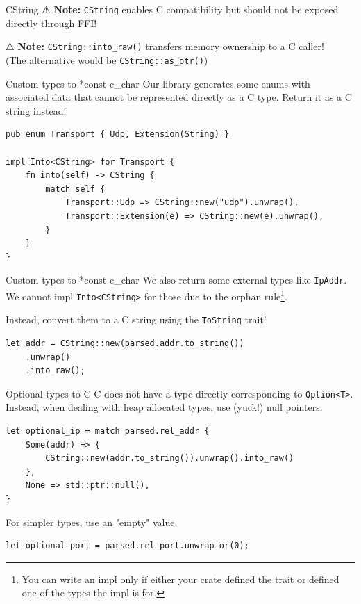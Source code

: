 \documentclass[aspectratio=1610,14pt,t]{beamer}
\begin{document}
\begin{frame}[c]{CString}
  ⚠ \textbf{Note:} \texttt{CString} enables C compatibility but should not be
  exposed directly through FFI!

  ⚠ \textbf{Note:} \texttt{CString::into\_raw()} transfers memory ownership to a
  C caller!\\(The alternative would be \texttt{CString::as\_ptr()})
\end{frame}

\begin{frame}[c,fragile]{Custom types to *const c\_char}
  Our library generates some enums with associated data that cannot be
  represented directly as a C type. Return it as a C string instead!

  \begin{verbatim}
pub enum Transport { Udp, Extension(String) }

impl Into<CString> for Transport {
    fn into(self) -> CString {
        match self {
            Transport::Udp => CString::new("udp").unwrap(),
            Transport::Extension(e) => CString::new(e).unwrap(),
        }
    }
}
  \end{verbatim}
\end{frame}

\begin{frame}[c,fragile]{Custom types to *const c\_char}
  We also return some external types like \texttt{IpAddr}. We cannot impl
  \texttt{Into<CString>} for those due to the orphan rule\footnote{You can write
  an impl only if either your crate defined the trait or defined one of the
  types the impl is for.}.

  Instead, convert them to a C string using the \texttt{ToString} trait!

  \begin{verbatim}
let addr = CString::new(parsed.addr.to_string())
    .unwrap()
    .into_raw();
  \end{verbatim}
\end{frame}

\begin{frame}[c,fragile]{Optional types to C}
  C does not have a type directly corresponding to \texttt{Option<T>}. Instead,
  when dealing with heap allocated types, use (yuck!) null pointers.

  \begin{verbatim}
let optional_ip = match parsed.rel_addr {
    Some(addr) => {
        CString::new(addr.to_string()).unwrap().into_raw()
    },
    None => std::ptr::null(),
}
  \end{verbatim}

  \pause

  For simpler types, use an "empty" value.

  \begin{verbatim}
let optional_port = parsed.rel_port.unwrap_or(0);
  \end{verbatim}
\end{frame}
\end{document}
